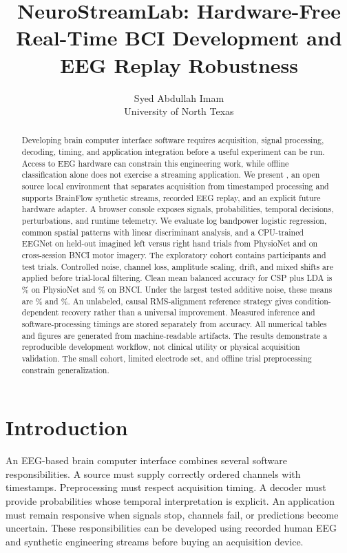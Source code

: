 \documentclass[11pt]{article}
\title{NeuroStreamLab: Hardware-Free Real-Time BCI Development and EEG Replay Robustness}
\author{Syed Abdullah Imam\\University of North Texas}
\date{}
\begin{document}
\maketitle
\begin{abstract}
Developing brain computer interface software requires acquisition, signal processing, decoding, timing, and application integration before a useful experiment can be run. Access to EEG hardware can constrain this engineering work, while offline classification alone does not exercise a streaming application. We present \project{}, an open source local environment that separates acquisition from timestamped processing and supports BrainFlow synthetic streams, recorded EEG replay, and an explicit future hardware adapter. A browser console exposes signals, probabilities, temporal decisions, perturbations, and runtime telemetry. We evaluate log bandpower logistic regression, common spatial patterns with linear discriminant analysis, and a CPU-trained EEGNet on held-out imagined left versus right hand trials from PhysioNet and on cross-session BNCI motor imagery. The exploratory cohort contains \TotalSubjects{} participants and \TestTrials{} test trials. Controlled noise, channel loss, amplitude scaling, drift, and mixed shifts are applied before trial-local filtering. Clean mean balanced accuracy for CSP plus LDA is \PhysioCSPClean{}\% on PhysioNet and \BNCICSPClean{}\% on BNCI. Under the largest tested additive noise, these means are \PhysioCSPNoise{}\% and \BNCICSPNoise{}\%. An unlabeled, causal RMS-alignment reference strategy gives condition-dependent recovery rather than a universal improvement. Measured inference and software-processing timings are stored separately from accuracy. All numerical tables and figures are generated from machine-readable artifacts. The results demonstrate a reproducible development workflow, not clinical utility or physical acquisition validation. The small cohort, limited electrode set, and offline trial preprocessing constrain generalization.
\end{abstract}

\section{Introduction}
An EEG-based brain computer interface combines several software responsibilities. A source must supply correctly ordered channels with timestamps. Preprocessing must respect acquisition timing. A decoder must provide probabilities whose temporal interpretation is explicit. An application must remain responsive when signals stop, channels fail, or predictions become uncertain. These responsibilities can be developed using recorded human EEG and synthetic engineering streams before buying an acquisition device.
\end{document}
